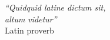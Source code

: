 \cleardoublepage
\thispagestyle{plain}

\vspace*{8cm}

\begin{flushright}
    \textsl{``Quidquid latine dictum sit, \\
        altum videtur''} \\
    \vspace*{1.5cm}
    Latin proverb
\end{flushright}
